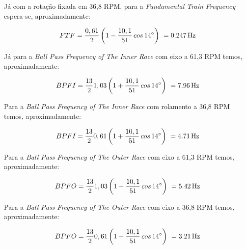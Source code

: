 \documentclass[
	12pt,				
	oneside,			
	a4paper,			
	english,			
	brazil,			
	]{abntex2ppgsi}
\begin{document}
Já com a rotação fixada em 36,8 RPM, para a \textit{Fundamental Train Frequency} espera-se, aproximadamente:

\begin{equation}
	FTF = \frac{0,61}{2} \left ( 1 - \frac{10,1}{51} \,cos \, \ang{14} \right )  \ = \SI{0,247}{{\hertz}}
	\label{eq: FTF no  Rolamento}
\end{equation}



Já para a \textit{Ball Pass Frequency of The Inner Race} com eixo a 61,3 RPM temos, aproximadamente:

\begin{equation}
	BPFI = \frac{13}{2}1,03 \left ( 1 + \frac{10,1}{51} \,cos \, \ang{14} \right )  \ = \SI{7,96}{{\hertz}}
	\label{eq: BPFI no rolamento}
\end{equation}

Para a \textit{Ball Pass Frequency of The Inner Race} com rolamento a 36,8 RPM temos, aproximadamente:

\begin{equation}
	BPFI = \frac{13}{2}0,61 \left ( 1 + \frac{10,1}{51} \,cos \, \ang{14} \right )  \ = \SI{4,71}{{\hertz}}
	\label{eq: BPFI no rolamento}
\end{equation}



Para a \textit{Ball Pass Frequency of The Outer Race} com eixo a 61,3 RPM temos, aproximadamente:

\begin{equation}
	BPFO = \frac{13}{2}1,03 \left ( 1 - \frac{10,1}{51} \,cos \, \ang{14} \right )  \ = \SI{5,42}{{\hertz}}
	\label{eq: BPFO no Rolamento}
\end{equation}

Para a \textit{Ball Pass Frequency of The Outer Race} com eixo a 36,8 RPM temos, aproximadamente:

\begin{equation}
	BPFO = \frac{13}{2}0,61 \left ( 1 - \frac{10,1}{51} \,cos \, \ang{14} \right )  \ = \SI{3,21}{{\hertz}}
	\label{eq: BPFO no Rolamento}
\end{equation}

\end{document}
